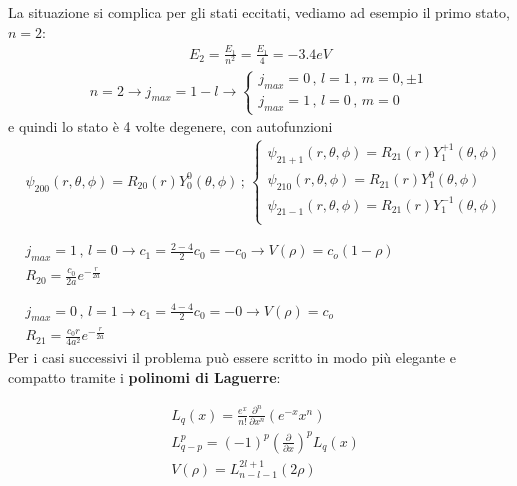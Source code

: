 La situazione si complica per gli stati eccitati, vediamo ad esempio il primo stato, $n=2$:
\begin{align}
E_2 = \frac{E_1}{n^2} = \frac{E_1}{4}= -3.4 eV
\end{align}
\begin{align}
n=2 \rightarrow j_{max}= 1 - l \rightarrow \left\{
\begin{array}{cc}
j_{max} =0 \, , \, l=1 \, , \, m=0,\pm 1 \\
j_{max}=1 \, , \, l=0 \, , \, m=0 \quad \;\;\:
\end{array}
\right.
\end{align}
e quindi lo stato è 4 volte degenere, con autofunzioni
\begin{align}
&\psi_{200}(r,\theta, \phi)= R_{20}(r)Y_0^0 (\theta, \phi) \, ;\, \left\{
\begin{array}{ccc}
\psi_{21+1}(r,\theta, \phi)=R_{21}(r)Y_1^{+1}(\theta, \phi) \\
\psi_{21 0}(r,\theta, \phi)=R_{21}(r)Y_1^0 (\theta, \phi)\quad\\
\psi_{21-1}(r,\theta, \phi)=R_{21}(r)Y_1^{-1}(\theta, \phi) \\
\end{array}
\right. \\
&\nonumber \\
&\nonumber \\
&j_{max} =1 \, , \, l=0 \rightarrow c_1= \frac{2-4}{2}c_0=-c_0 \rightarrow V(\rho)= c_o(1 -\rho) \\
&R_{20}= \frac{c_0}{2a}e^{-\frac{r}{2a}} \\
&\nonumber \\
&\nonumber \\
&j_{max} =0 \, , \, l=1 \rightarrow c_1= \frac{4-4}{2}c_0=-0 \rightarrow V(\rho)= c_o\\
&R_{21}= \frac{c_0 r}{4a^2}e^{-\frac{r}{2a}}
\end{align}
\newpage
Per i casi successivi il problema può essere scritto in modo più elegante e compatto tramite i \textbf{polinomi di Laguerre}:

\begin{align}
{}&L_q(x)= \frac{e^x}{n!}\frac{\partial^n}{\partial x^n}(e^{-x}x^n)\\
&L_{q-p}^p=(-1)^p \left( \frac{\partial}{\partial x} \right)^p L_q(x) \\
&V(\rho)= L_{n-l-1}^{2l+1}(2\rho)
\end{align}